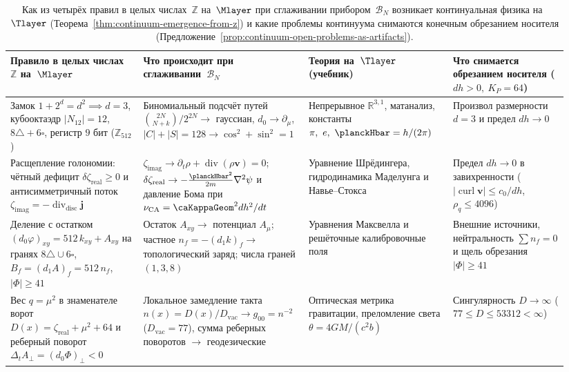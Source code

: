 \begin{table}[htbp]
\centering
\caption{Как из четырёх правил в целых числах~$\mathbb{Z}$ на~$\Mlayer$ при сглаживании прибором~$\mathcal{B}_N$ возникает континуальная физика на~$\Tlayer$ (Теорема~\ref{thm:continuum-emergence-from-z}) и какие проблемы континуума снимаются конечным обрезанием носителя (Предложение~\ref{prop:continuum-open-problems-as-artifacts}).}
\label{tab:z-to-continuum-physics}
\footnotesize
\setlength{\tabcolsep}{3.5pt}
\begin{tabular}{@{}p{0.23\linewidth}p{0.26\linewidth}p{0.25\linewidth}p{0.20\linewidth}@{}}
\toprule
Правило в целых числах~$\mathbb{Z}$ на~$\Mlayer$ & Что происходит при сглаживании~$\mathcal{B}_N$ & Теория на~$\Tlayer$ (учебник) & Что снимается обрезанием носителя ($dh>0,\ K_P=64$) \\
\midrule
Замок $1+2^d=d^2\implies d=3$, кубооктаэдр $|N_{12}|=12$, $8\triangle+6\square$, регистр $9$ бит ($\mathbb{Z}_{512}$) &
Биномиальный подсчёт путей $\binom{2N}{N+k}/2^{2N}\to$ гауссиан, $d_0\to\partial_\mu$, $|C|+|S|=128\to\cos^2+\sin^2=1$ &
Непрерывное $\mathbb{R}^{3,1}$, матанализ, константы $\pi,\ e,\ \planckHbar=h/(2\pi)$ &
Произвол размерности $d=3$ и предел $dh\to 0$ \\
\addlinespace[2pt]
Расщепление голономии: чётный дефицит $\delta\zeta_{\mathrm{real}}\ge 0$ и антисимметричный поток $\zeta_{\mathrm{imag}}=-\operatorname{div}_{\mathrm{disc}}\mathbf{j}$ &
$\zeta_{\mathrm{imag}}\to\partial_t\rho+\operatorname{div}(\rho\mathbf{v})=0$; $\delta\zeta_{\mathrm{real}}\to -\frac{\planckHbar^2}{2m}\nabla^2\psi$ и давление Бома при $\nu_{\mathrm{CA}}=\caKappaGeom^2 dh^2/dt$ &
Уравнение Шрёдингера, гидродинамика Маделунга и Навье--Стокса &
Предел $dh\to 0$ в завихренности ($|\operatorname{curl}\mathbf{v}|\le c_0/dh$, $\rho_q\le 4096$) \\
\addlinespace[2pt]
Деление с остатком $(d_0\varphi)_{xy}=512\,k_{xy}+A_{xy}$ на гранях $8\triangle\cup 6\square$, $B_f=(d_1 A)_f=512\,n_f$, $|\Phi|\ge 41$ &
Остаток $A_{xy}\to$ потенциал $A_\mu$; частное $n_f=-(d_1 k)_f\to$ топологический заряд; числа граней $(1,3,8)$ &
Уравнения Максвелла и решёточные калибровочные поля &
Внешние источники, нейтральность $\sum n_f=0$ и щель обрезания $|\Phi|\ge 41$ \\
\addlinespace[2pt]
Вес $q=\mu^2$ в знаменателе ворот $D(x)=\zeta_{\mathrm{real}}+\mu^2+64$ и реберный поворот $\Delta_t A_\perp=(d_0\Phi)_\perp < 0$ &
Локальное замедление такта $n(x)=D(x)/D_{\mathrm{vac}}\to g_{00}=n^{-2}$ ($D_{\mathrm{vac}}=77$), сумма реберных поворотов $\to$ геодезические &
Оптическая метрика гравитации, преломление света $\theta=4GM/(c^2 b)$ &
Сингулярность $D\to\infty$ ($77\le D\le 53312<\infty$) \\
\bottomrule
\end{tabular}
\end{table}

